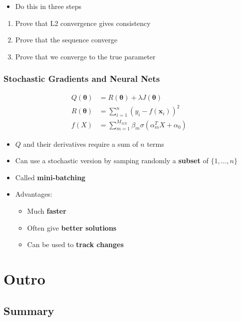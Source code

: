 \documentclass[
  letterpaper,
  DIV=11,
  numbers=noendperiod]{scrreprt}
\providecommand{\tightlist}{%
  \setlength{\itemsep}{0pt}\setlength{\parskip}{0pt}}\usepackage{longtable,booktabs,array}
\theoremstyle{definition}
\theoremstyle{definition}
\theoremstyle{remark}
\begin{document}
\begin{itemize}
\tightlist
\item
  Do this in three steps
\end{itemize}

\begin{enumerate}
\def\labelenumi{\arabic{enumi}.}
\item
  Prove that L2 convergence gives consistency
\item
  Prove that the sequence converge
\item
  Prove that we converge to the true parameter
\end{enumerate}

\section{Stochastic Gradients and Neural
Nets}\label{stochastic-gradients-and-neural-nets}

\[
\begin{align*}
Q(\pmb{\theta}) &= R(\pmb{\theta}) + \lambda J (\pmb{\theta})\\
R(\pmb{\theta}) &= \sum_{i=1}^n (y_i - f(\pmb{x}_i))^2\\
f(X) &= \sum_{m=1}^{M_{NN}}\beta_m \sigma (\alpha_m^T X + \alpha_0)
\end{align*}
\]

\begin{itemize}
\item
  \(Q\) and their derivatives require a sum of \(n\) terms
\item
  Can use a stochastic version by samping randomly a \textbf{subset} of
  \(\{1,\ldots, n\}\)
\item
  Called \textbf{mini-batching}
\item
  Advantages:

  \begin{itemize}
  \tightlist
  \item
    Much \textbf{faster}
  \item
    Often give \textbf{better solutions}
  \item
    Can be used to \textbf{track changes}
  \end{itemize}
\end{itemize}

\part{Outro}

\chapter{Summary}\label{summary}
\end{document}
